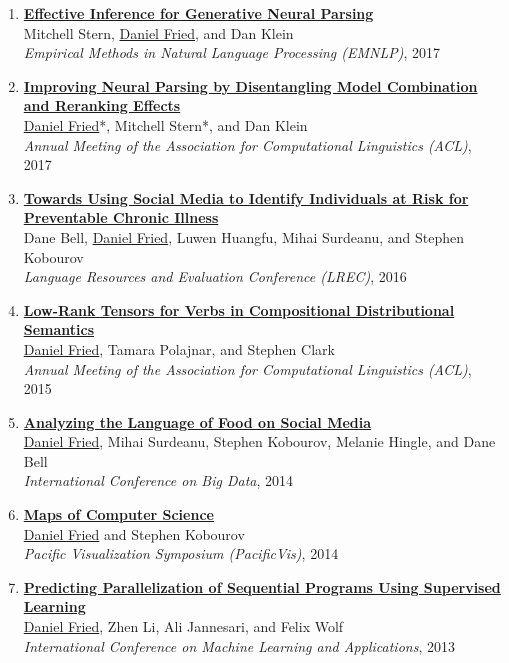 \begin{enumerate}[leftmargin=-1mm,partopsep=0pt]
\item \href{http://arxiv.org/abs/1707.08976}{\textbf{Effective Inference for Generative Neural Parsing}} \\
  Mitchell Stern, \underline{Daniel Fried}, and Dan Klein\\
  \emph{Empirical Methods in Natural Language Processing (EMNLP)}, 2017

\item \href{https://arxiv.org/abs/1707.03058}{\textbf{Improving Neural Parsing by Disentangling Model Combination and Reranking Effects}} \\
  \underline{Daniel Fried}*, Mitchell Stern*, and Dan Klein\\
  \emph{Annual Meeting of the Association for Computational Linguistics (ACL)}, 2017

\item \href{http://arxiv.org/abs/1603.03784}{\textbf{Towards Using Social Media to Identify Individuals at Risk for Preventable Chronic Illness}} \\
  Dane Bell, \underline{Daniel Fried}, Luwen Huangfu, Mihai Surdeanu, and Stephen Kobourov\\
  \emph{Language Resources and Evaluation Conference (LREC)}, 2016

\item \href{https://people.eecs.berkeley.edu/~dfried/papers/FPC-verb_tensors.pdf}{\textbf{Low-Rank Tensors for Verbs in Compositional Distributional Semantics}} \\
  \underline{Daniel Fried}, Tamara Polajnar, and Stephen Clark\\
  \emph{Annual Meeting of the Association for Computational Linguistics (ACL)}, 2015

\item \href{https://people.eecs.berkeley.edu/~dfried/papers/Fried-bigdata2014.pdf}{\textbf{Analyzing the Language of Food on Social Media}} \\
  \underline{Daniel Fried}, Mihai Surdeanu, Stephen Kobourov, Melanie Hingle, and Dane Bell\\
  \emph{International Conference on Big Data}, 2014

\item \href{https://arxiv.org/abs/1304.2681}{\textbf{Maps of Computer Science}} \\
  \underline{Daniel Fried} and Stephen Kobourov\\
  \emph{Pacific Visualization Symposium (PacificVis)}, 2014

\item \href{https://people.eecs.berkeley.edu/~dfried/papers/Fried-ICMLA2013.pdf}{\textbf{Predicting Parallelization of Sequential Programs Using Supervised Learning}} \\
  \underline{Daniel Fried}, Zhen Li, Ali Jannesari, and Felix Wolf\\
  \emph{International Conference on Machine Learning and Applications}, 2013


\end{enumerate}
